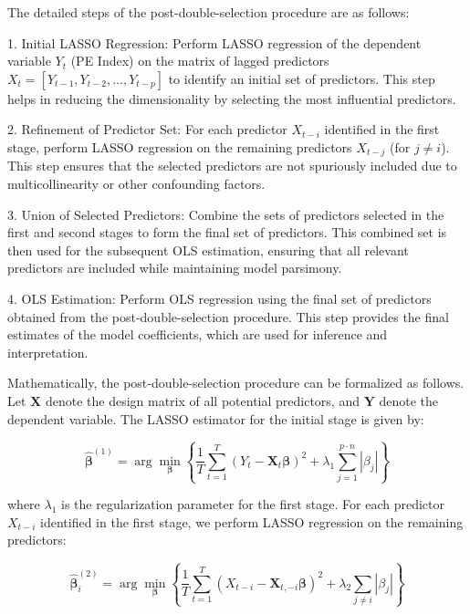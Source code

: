 \documentclass[11pt]{article}
\begin{document}
The detailed steps of the post-double-selection procedure are as follows:

1. Initial LASSO Regression: Perform LASSO regression of the dependent variable \(Y_t\) (PE Index) on the matrix of lagged predictors \(X_t = [Y_{t-1}, Y_{t-2}, \ldots, Y_{t-p}]\) to identify an initial set of predictors. This step helps in reducing the dimensionality by selecting the most influential predictors.

2. Refinement of Predictor Set: For each predictor \(X_{t-i}\) identified in the first stage, perform LASSO regression on the remaining predictors \(X_{t-j}\) (for \(j \neq i\)). This step ensures that the selected predictors are not spuriously included due to multicollinearity or other confounding factors.

3. Union of Selected Predictors: Combine the sets of predictors selected in the first and second stages to form the final set of predictors. This combined set is then used for the subsequent OLS estimation, ensuring that all relevant predictors are included while maintaining model parsimony.

4. OLS Estimation: Perform OLS regression using the final set of predictors obtained from the post-double-selection procedure. This step provides the final estimates of the model coefficients, which are used for inference and interpretation.

Mathematically, the post-double-selection procedure can be formalized as follows. Let \(\mathbf{X}\) denote the design matrix of all potential predictors, and \(\mathbf{Y}\) denote the dependent variable. The LASSO estimator for the initial stage is given by:

\begin{equation}
\hat{\boldsymbol{\beta}}^{(1)} = \arg\min_{\boldsymbol{\beta}} \left\{ \frac{1}{T} \sum_{t=1}^T (Y_t - \mathbf{X}_t \boldsymbol{\beta})^2 + \lambda_1 \sum_{j=1}^{p \cdot n} |\beta_j| \right\}
\end{equation}


where \(\lambda_1\) is the regularization parameter for the first stage. For each predictor \(X_{t-i}\) identified in the first stage, we perform LASSO regression on the remaining predictors:

\begin{equation}
\hat{\boldsymbol{\beta}}^{(2)}_i = \arg\min_{\boldsymbol{\beta}} \left\{ \frac{1}{T} \sum_{t=1}^T (X_{t-i} - \mathbf{X}_{t,-i} \boldsymbol{\beta})^2 + \lambda_2 \sum_{j \neq i} |\beta_j| \right\}
\end{equation}
\end{document}
